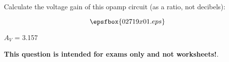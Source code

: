 

Calculate the voltage gain of this opamp circuit (as a ratio, not decibels):

$$\epsfbox{02719x01.eps}$$







$A_V$ = 3.157







{\bf This question is intended for exams only and not worksheets!}.




